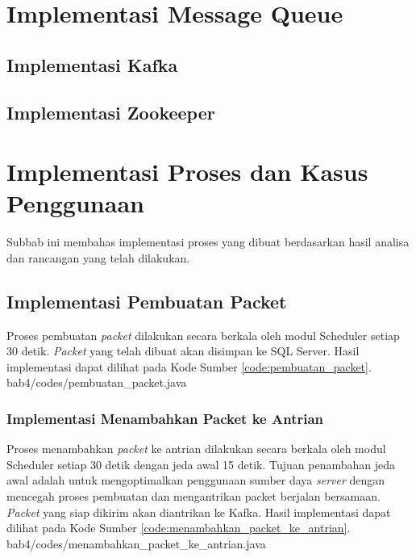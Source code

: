 \section{Implementasi Message Queue}

\subsection{Implementasi Kafka}

\subsection{Implementasi Zookeeper}

\section{Implementasi Proses dan Kasus Penggunaan}
\par Subbab ini membahas implementasi proses yang dibuat berdasarkan hasil analisa dan rancangan yang telah dilakukan.

\subsection{Implementasi Pembuatan Packet}
\par Proses pembuatan \textit{packet} dilakukan secara berkala oleh modul Scheduler setiap 30 detik. \textit{Packet} yang telah dibuat akan disimpan ke SQL Server. Hasil implementasi dapat dilihat pada Kode Sumber \ref{code:pembuatan_packet}.
 {bab4/codes/pembuatan_packet.java}

\subsubsection{Implementasi Menambahkan Packet ke Antrian}
\par Proses menambahkan \textit{packet} ke antrian dilakukan secara berkala oleh modul Scheduler setiap 30 detik dengan jeda awal 15 detik. Tujuan penambahan jeda awal adalah untuk mengoptimalkan penggunaan sumber daya \textit{server} dengan mencegah proses pembuatan dan mengantrikan packet berjalan bersamaan. \textit{Packet} yang siap dikirim akan diantrikan ke Kafka. Hasil implementasi dapat dilihat pada Kode Sumber \ref{code:menambahkan_packet_ke_antrian}.
 {bab4/codes/menambahkan_packet_ke_antrian.java}

